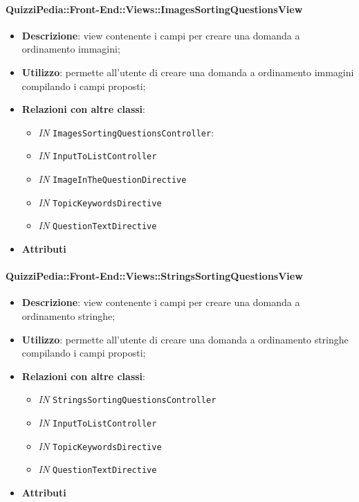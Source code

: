 \paragraph{QuizziPedia::Front-End::Views::ImagesSortingQuestionsView}
\begin{itemize}
	\item \textbf{Descrizione}: view contenente i campi per creare una domanda a ordinamento immagini;
	\item \textbf{Utilizzo}: permette all'utente di creare una domanda a ordinamento immagini compilando i campi proposti;
	\item \textbf{Relazioni con altre classi}:
	\begin{itemize}
		\item \textit{IN} \texttt{ImagesSortingQuestionsController}:
		\item \textit{IN} \texttt{InputToListController} \\
		\item \textit{IN} \texttt{ImageInTheQuestionDirective} \\
		\item \textit{IN} \texttt{TopicKeywordsDirective} \\
		\item \textit{IN} \texttt{QuestionTextDirective} \\ 
	\end{itemize}
	\item \textbf{Attributi}
\end{itemize}

\paragraph{QuizziPedia::Front-End::Views::StringsSortingQuestionsView}
\begin{itemize}
	\item \textbf{Descrizione}: view contenente i campi per creare una domanda a ordinamento stringhe;
	\item \textbf{Utilizzo}: permette all'utente di creare una domanda a ordinamento stringhe compilando i campi proposti;
	\item \textbf{Relazioni con altre classi}:
		\begin{itemize}
			\item \textit{IN} \texttt{StringsSortingQuestionsController} \\
			\item \textit{IN} \texttt{InputToListController} \\
			\item \textit{IN} \texttt{TopicKeywordsDirective} \\
			\item \textit{IN} \texttt{QuestionTextDirective} \\ 
		\end{itemize}
	\item \textbf{Attributi}
\end{itemize}


